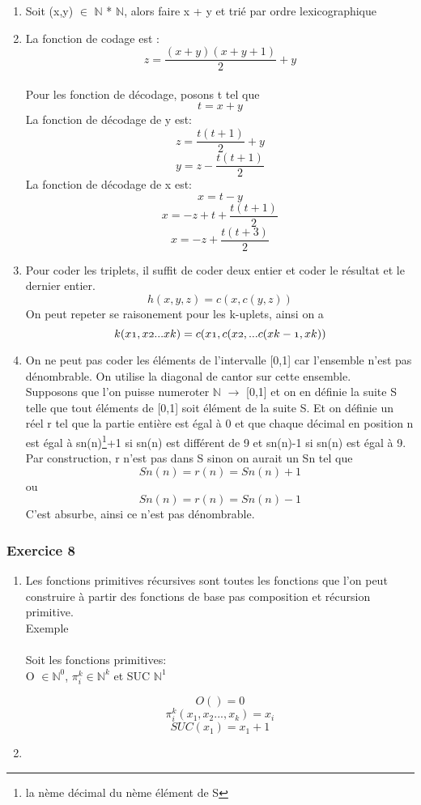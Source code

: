 \documentclass{article}
\begin{document}
\begin{enumerate}
\item Soit (x,y) $\in$ $\mathbb{N}$ * $\mathbb{N}$, alors faire x + y et trié par ordre lexicographique
\item La fonction de codage est : \[z = \frac{(x+y)(x+y+1)}{2} + y\]\\
Pour les fonction de décodage, posons t tel que \[t = x + y\]
La fonction de décodage de y est: \[z =\frac{t(t+1)}{2} + y\] \[y = z - \frac{t(t+1)}{2}\]
La fonction de décodage de x est: \[x = t - y\] \[x = -z + t + \frac{t(t+1)}{2}\] \[x = -z + \frac{t(t+3)}{2}\]
\item Pour coder les triplets, il suffit de coder deux entier et coder le résultat et le dernier entier. 
  \[h(x,y,z)=c(x , c(y,z))\]
On peut repeter se raisonement pour les k-uplets, ainsi on a 
\[k(x\oldstylenums{1},x\oldstylenums{2}... x\oldstylenums{k}) = c(x\oldstylenums{1} , c(x\oldstylenums{2} , ... c(x\oldstylenums{k-1},x\oldstylenums{k}))\]
\item On ne peut pas coder les éléments de l'intervalle [0,1] car l'ensemble n'est pas dénombrable. On utilise la diagonal de cantor sur cette ensemble.\\
Supposons que l'on puisse numeroter $\mathbb{N}$  $\rightarrow$ [0,1] et on en définie la suite S telle que tout éléments de [0,1] soit élément de la suite S.
Et on définie un réel r tel que la partie entière est égal à 0 et que chaque décimal en position n est égal à sn(n)\footnote{la nème décimal du nème élément de S}+1 si sn(n) est différent de 9 et sn(n)-1 si sn(n) est égal à 9.\\
Par construction, r n'est pas dans S sinon on aurait un Sn tel que \[Sn(n)=r(n)=Sn(n)+1\] ou \[Sn(n)=r(n)=Sn(n)-1\] C'est absurbe, ainsi ce n'est pas dénombrable. 
   
  
\end{enumerate}




\subsubsection{Exercice 8}
\begin{enumerate}
\item Les fonctions primitives récursives sont toutes les fonctions que l'on peut construire à partir des fonctions de base pas composition et récursion primitive.\\

  Exemple\\ \\
Soit les fonctions primitives: \\
O $\in \mathbb{N}^0$, $\pi_i^k \in \mathbb{N}^k$ et SUC $\mathbb{N}^1$ 

 \[O() = 0 \] 
\[\pi_i^k(x_1,x_2...,x_k) = x_i \] 
\[SUC(x_1) = x_1 + 1 \] 

  
\item  
\end{enumerate}
\end{document}
